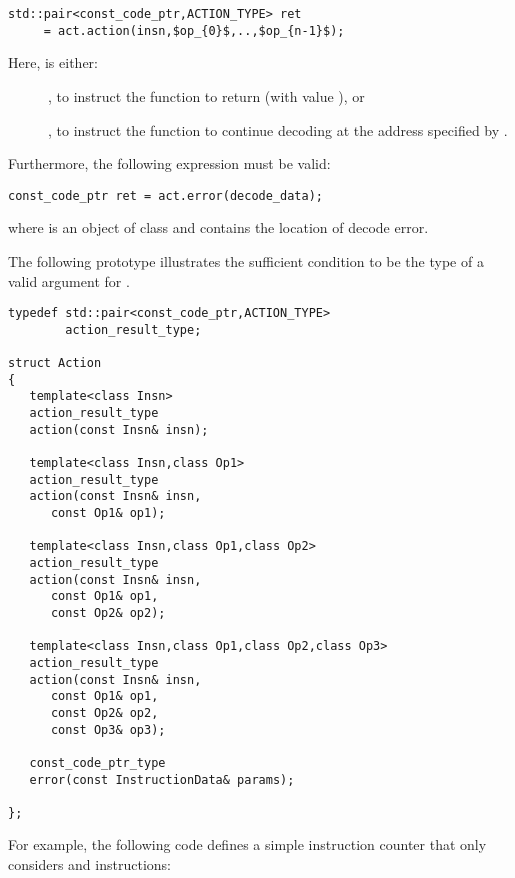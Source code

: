 \documentclass{article}
\begin{document}
\begin{lstlisting}[mathescape,frame=single]
std::pair<const_code_ptr,ACTION_TYPE> ret 
     = act.action(insn,$op_{0}$,..,$op_{n-1}$);
\end{lstlisting}
Here,  is either:
\begin{description}
\item[]   , to instruct the function to return (with value ), or
\item[] , to instruct the function to continue decoding at the address specified by
.
\end{description}



\noindent Furthermore, the following expression must be valid:
\begin{lstlisting}[frame=single]
const_code_ptr ret = act.error(decode_data);
\end{lstlisting}
\noindent where  is an object of class  and
contains the location of decode error.

The following prototype illustrates the sufficient 
condition to be the type of a valid argument for .

\begin{lstlisting}[frame=single]
typedef std::pair<const_code_ptr,ACTION_TYPE> 
        action_result_type;

struct Action
{
   template<class Insn>
   action_result_type
   action(const Insn& insn);

   template<class Insn,class Op1>
   action_result_type
   action(const Insn& insn,
	  const Op1& op1);

   template<class Insn,class Op1,class Op2>
   action_result_type
   action(const Insn& insn,
	  const Op1& op1,
	  const Op2& op2);

   template<class Insn,class Op1,class Op2,class Op3>
   action_result_type
   action(const Insn& insn,
	  const Op1& op1,
	  const Op2& op2,
	  const Op3& op3);
   
   const_code_ptr_type        
   error(const InstructionData& params);

};
\end{lstlisting}

For example, the following code defines a simple instruction counter
that only considers  and  instructions:
\end{document}
